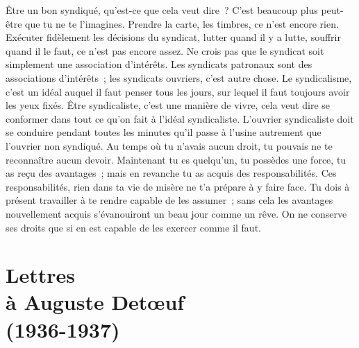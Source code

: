 \documentclass[french,twoside]{book} %
\begin{document}
Être un bon syndiqué, qu'est-ce que cela veut dire ? C'est beaucoup plus peut-être que tu ne te l'imagines. Prendre la carte, les timbres, ce n'est encore rien. Exécuter fidèlement les décisions du syndicat, lutter quand il y a lutte, souffrir quand il le faut, ce n'est pas encore assez. Ne crois pas que le syndicat soit simplement une association d'intérêts. Les syndicats patronaux sont des associations d'intérêts ; les syndicats ouvriers, c'est autre chose. Le syndicalisme, c'est un idéal auquel il faut penser tous les jours, sur lequel il faut toujours avoir les yeux fixés. Être syndicaliste, c'est une manière de vivre, cela veut dire se conformer dans tout ce qu'on fait à l'idéal syndicaliste. L'ouvrier syndicaliste doit se conduire pendant toutes les minutes qu'il passe à l'usine autrement que l'ouvrier non syndiqué. Au temps où tu n'avais aucun droit, tu pouvais ne te reconnaître aucun devoir. Maintenant tu es quelqu'un, tu possèdes une force, tu as reçu des avantages ; mais en revanche tu as acquis des responsabilités. Ces responsabilités, rien dans ta vie de misère ne t'a prépare à y faire face. Tu dois à présent travailler à te rendre capable de les assumer ; sans cela les avantages nouvellement acquis s'évanouiront un beau jour comme un rêve. On ne conserve ses droits que si en est capable de les exercer comme il faut.
\section[Lettres, à Auguste Detœuf, (1936-1937)]{Lettres \\
à Auguste Detœuf \\
(1936-1937)}\renewcommand{\leftmark}{Lettres \\
à Auguste Detœuf \\
(1936-1937)}
\end{document}
